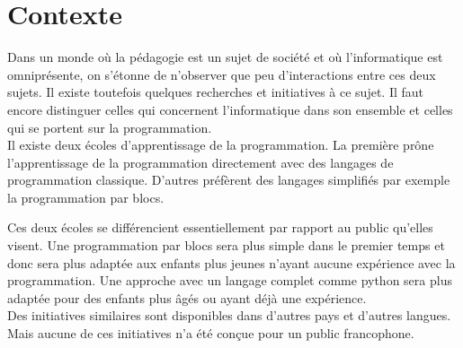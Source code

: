 \section{Contexte}
\label{intro-context}
Dans un monde où la pédagogie est un sujet de société et où l'informatique est omniprésente, on s'étonne de n'observer que peu d'interactions entre ces deux sujets. Il existe toutefois quelques recherches et initiatives à ce sujet. Il faut encore distinguer celles qui concernent l'informatique dans son ensemble et celles qui se portent sur la programmation.\\

Il existe deux écoles d'apprentissage de la programmation. La première prône l'apprentissage de la programmation directement avec des langages de programmation classique. D'autres préfèrent des langages simplifiés par exemple la programmation par \glspl{bloc}.

Ces deux écoles se différencient essentiellement par rapport au public qu'elles visent. Une programmation par \glspl{bloc} sera plus simple dans le premier temps et donc sera plus adaptée aux enfants plus jeunes n'ayant aucune expérience avec la programmation. Une approche avec un langage complet comme python sera plus adaptée pour des enfants plus âgés ou ayant déjà une expérience.\\

Des initiatives similaires sont disponibles dans d'autres pays et d'autres langues. Mais aucune de ces initiatives n'a été conçue pour un public francophone.




